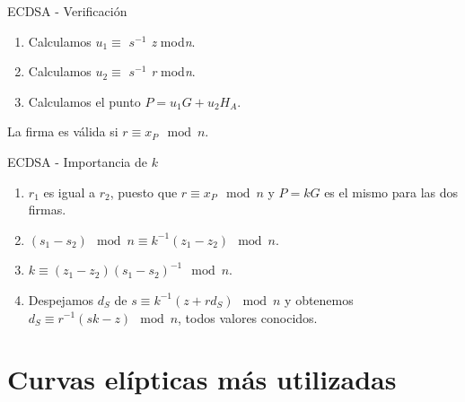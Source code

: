 \documentclass[12pt]{beamer}
\begin{document}
\begin{frame}[fragile]{ECDSA - Verificación}
\begin{enumerate}
	\item Calculamos $u_1 \equiv$ \textit{$s^{-1}$ z} mod\textit{n}.
	\item Calculamos $u_2 \equiv$ \textit{$s^{-1}$ r} mod\textit{n}.
	\item Calculamos el punto $P = u_1G + u_2 H_A$.	
\end{enumerate}

\vspace{2mm}
  La firma es válida si $r \equiv x_P \mod n$.

\end{frame}

\begin{frame}[fragile]{ECDSA - Importancia de $k$}
  \begin{enumerate}
	\item $r_1$ es igual a $r_2$, puesto que $ r \equiv x_P \mod n$ y $P = kG$ es el mismo para las dos firmas.
	\item  $(s_1 - s_2) \mod n \equiv k^{-1} (z_1 - z_2) \mod n$.
	\item $k  \equiv (z_1 - z_2) (s_1 -s_2)^{-1} \mod n$.
        \item Despejamos $d_S$ de $s \equiv k^{-1}(z + r d_S) \mod n$ y obtenemos $d_S \equiv r^{-1}(sk - z) \mod n$, todos valores conocidos. 
\end{enumerate}
\end{frame}

\section{Curvas elípticas más utilizadas}\label{ej_curvas}
\end{document}
